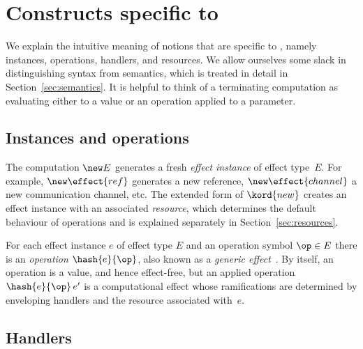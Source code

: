 \section{Constructs specific to \eff}
\label{sec:eff-specific}

We explain the intuitive meaning of notions that are specific to \eff, namely
instances, operations, handlers, and resources.
We allow ourselves some slack in distinguishing syntax from semantics, which is treated in detail in Section~\ref{sec:semantics}.
It is helpful to think of a terminating computation as evaluating either to a value or an operation applied to a parameter.

\subsection{Instances and operations}
\label{sec:instances-operations}

The computation $\new E$ generates a fresh \emph{effect instance} of effect type~$E$.
For example, $\new \effect{ref}$ generates a new reference, $\new \effect{channel}$ a new communication channel, etc.
%
The extended form of $\kord{new}$ creates an effect instance with an associated \emph{resource},
which determines the default behaviour of operations and is explained separately in
Section~\ref{sec:resources}.

For each effect instance $e$ of effect type $E$ and an operation symbol $\op \in E$ there
is an \emph{operation} $\hash{e}{\op}$, also known as a \emph{generic
  effect}~\cite{plotkin03algebraic}. By itself, an operation is a value, and hence
effect-free, but an applied operation $\hash{e}{\op}\,e'$ is a computational effect
whose ramifications are determined by enveloping handlers and the resource associated with~$e$.

\subsection{Handlers}
\label{sec:handlers}

